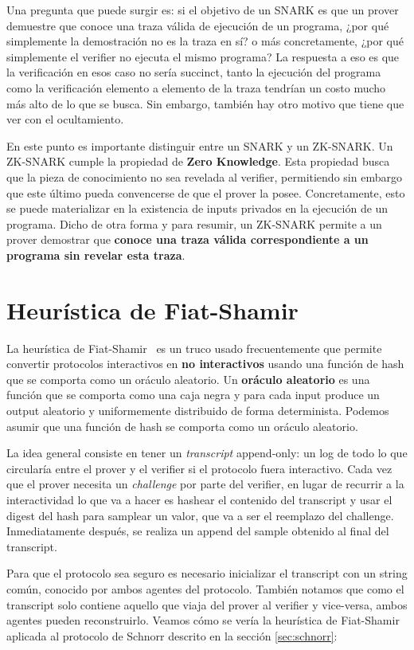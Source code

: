 Una pregunta que puede surgir es: si el objetivo de un SNARK es que un prover demuestre que conoce una traza válida de ejecución de un programa, ¿por qué simplemente la demostración no es la traza en sí? o más concretamente, ¿por qué simplemente el verifier no ejecuta el mismo programa? La respuesta a eso es que la verificación en esos caso no sería succinct, tanto la ejecución del programa como la verificación elemento a elemento de la traza tendrían un costo mucho más alto de lo que se busca. Sin embargo, también hay otro motivo que tiene que ver con el ocultamiento.

En este punto es importante distinguir entre un SNARK y un ZK-SNARK. Un ZK-SNARK\cite{petkus2019and} cumple la propiedad de \textbf{Zero Knowledge}. Esta propiedad busca que la pieza de conocimiento no sea revelada al verifier, permitiendo sin embargo que este último pueda convencerse de que el prover la posee. Concretamente, esto se puede materializar en la existencia de inputs privados en la ejecución de un programa. Dicho de otra forma y para resumir, un ZK-SNARK permite a un prover demostrar que \textbf{conoce una traza válida correspondiente a un programa sin revelar esta traza}.

\section{Heurística de Fiat-Shamir}\label{sec:shamir}
La heurística de Fiat-Shamir~\cite{bernhard2012not} es un truco usado frecuentemente que permite convertir protocolos interactivos en \textbf{no interactivos} usando una función de hash que se comporta como un oráculo aleatorio. Un \textbf{oráculo aleatorio} es una función que se comporta como una caja negra y para cada input produce un output aleatorio y uniformemente distribuido de forma determinista. Podemos asumir que una función de hash se comporta como un oráculo aleatorio.

La idea general consiste en tener un \textit{transcript} append-only: un log de todo lo que circularía entre el prover y el verifier si el protocolo fuera interactivo. Cada vez que el prover necesita un \textit{challenge} por parte del verifier, en lugar de recurrir a la interactividad lo que va a hacer es hashear el contenido del transcript y usar el digest del hash para samplear un valor, que va a ser el reemplazo del challenge. Inmediatamente después, se realiza un append del sample obtenido al final del transcript. 

Para que el protocolo sea seguro es necesario inicializar el transcript con un string común, conocido por ambos agentes del protocolo. También notamos que como el transcript solo contiene aquello que viaja del prover al verifier y vice-versa, ambos agentes pueden reconstruirlo. Veamos cómo se vería la heurística de Fiat-Shamir aplicada al protocolo de Schnorr descrito en la sección \ref{sec:schnorr}:

